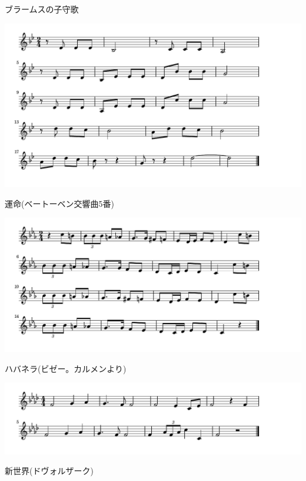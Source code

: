 \documentclass[a4paper]{ltjsarticle}
\begin{document}
\vspace{-10mm} \hspace{10mm}
ブラームスの子守歌

\includegraphics[clip]{unmei_crop.pdf}

\vspace{-10mm} \hspace{10mm}
運命(ベートーベン交響曲5番)

\includegraphics[clip]{habanera_crop.pdf}

\vspace{-10mm} \hspace{10mm}
ハバネラ(ビゼー。カルメンより)

\includegraphics[clip]{shinsekai_crop.pdf}

\vspace{-10mm} \hspace{10mm}
新世界(ドヴォルザーク)
\end{document}
